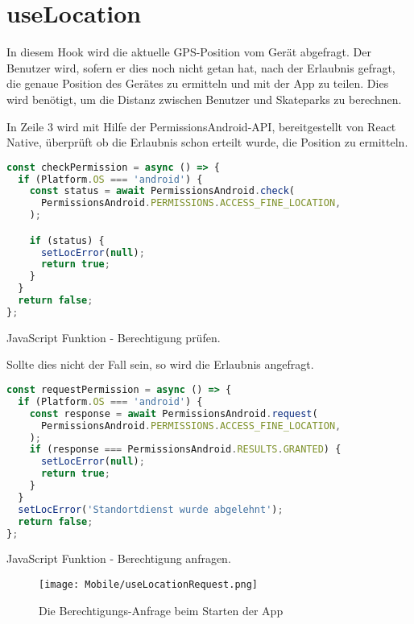 \section{useLocation}
In diesem Hook wird die aktuelle GPS-Position vom Gerät abgefragt. Der Benutzer wird, sofern er dies
noch nicht getan hat, nach der Erlaubnis gefragt, die genaue Position des Gerätes zu ermitteln und
mit der App zu teilen. Dies wird benötigt, um die Distanz zwischen Benutzer und Skateparks zu
berechnen.

In Zeile 3 wird mit Hilfe der PermissionsAndroid-API, bereitgestellt von React Native, überprüft
ob die Erlaubnis schon erteilt wurde, die Position zu ermitteln.

\begin{code}[htp]
\begin{lstlisting}[firstnumber=1,language=JavaScript, style=JSX]
const checkPermission = async () => {
  if (Platform.OS === 'android') {
    const status = await PermissionsAndroid.check(
      PermissionsAndroid.PERMISSIONS.ACCESS_FINE_LOCATION,
    );

    if (status) {
      setLocError(null);
      return true;
    }
  }
  return false;
};
\end{lstlisting}
\caption{JavaScript Funktion - Berechtigung prüfen.}
\end{code}

Sollte dies nicht der Fall sein, so wird die Erlaubnis angefragt.

\begin{code}[htp]
\begin{lstlisting}[firstnumber=1,language=JavaScript, style=JSX]
const requestPermission = async () => {
  if (Platform.OS === 'android') {
    const response = await PermissionsAndroid.request(
      PermissionsAndroid.PERMISSIONS.ACCESS_FINE_LOCATION,
    );
    if (response === PermissionsAndroid.RESULTS.GRANTED) {
      setLocError(null);
      return true;
    }
  }
  setLocError('Standortdienst wurde abgelehnt');
  return false;
};
\end{lstlisting}
\caption{JavaScript Funktion - Berechtigung anfragen.}
\end{code}


\begin{figure}[H]
  \begin{center}
    \texttt{[image: Mobile/useLocationRequest.png]}
    \caption{Die Berechtigungs-Anfrage beim Starten der App}
  \end{center}
\end{figure}

